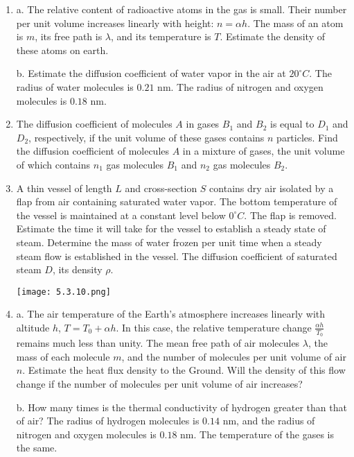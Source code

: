 \documentclass{article}
\begin{document}
\begin{enumerate}[label=5.3.\arabic*]
\item a. The relative content of radioactive atoms in the gas is small. Their number per unit volume increases linearly with height: $n = \alpha h$. The mass of an atom is $m$, its free path is $\lambda$, and its temperature is $T$. Estimate the density of these atoms on earth.

b. Estimate the diffusion coefficient of water vapor in the air at $20^\circ C$. The radius of water molecules is $0.21$ nm. The radius of nitrogen and oxygen molecules is $0.18$ nm.

\item The diffusion coefficient of molecules $A$ in gases $B_1$ and $B_2$ is equal to $D_1$ and $D_2$, respectively, if the unit volume of these gases contains $n$ particles. Find the diffusion coefficient of molecules $A$ in a mixture of gases, the unit volume of which contains $n_1$ gas molecules $B_1$ and $n_2$ gas molecules $B_2$.

\item A thin vessel of length $L$ and cross-section $S$ contains dry air isolated by a flap from air containing saturated water vapor. The bottom temperature of the vessel is maintained at a constant level below $0^\circ C$. The flap is removed. Estimate the time it will take for the vessel to establish a steady state of steam. Determine the mass of water frozen per unit time when a steady steam flow is established in the vessel. The diffusion coefficient of saturated steam $D$, its density $\rho$.

\begin{center}
    \texttt{[image: 5.3.10.png]}
\end{center}


\item a. The air temperature of the Earth's atmosphere increases linearly with altitude $h$, $T = T_0 + \alpha h$. In this case, the relative temperature change $\frac{\alpha h}{T_0}$ remains much less than unity. The mean free path of air molecules $\lambda$, the mass of each molecule $m$, and the number of molecules per unit volume of air $n$. Estimate the heat flux density to the Ground. Will the density of this flow change if the number of molecules per unit volume of air increases? 

b. How many times is the thermal conductivity of hydrogen greater than that of air? The radius of hydrogen molecules is $0.14$ nm, and the radius of nitrogen and oxygen molecules is $0.18$ nm. The temperature of the gases is the same.


\end{enumerate}
\end{document}
